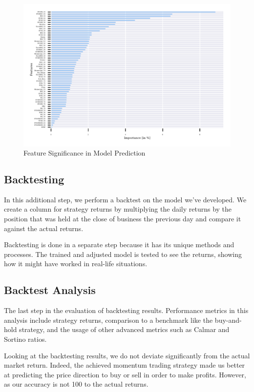 \begin{figure}
\centering
\begin{adjustbox}{max width=1.2\textwidth,center}
\includegraphics[scale=1.2]{./pdf/report/feature_importance.pdf}
\end{adjustbox}
\caption{Feature Significance in Model Prediction}
\label{fig:feature_importance}
\end{figure}


\subsection{Backtesting}

In this additional step, we perform a backtest on the model
we’ve developed. We create a column for strategy returns by multiplying the daily
returns by the position that was held at the close of business the previous day and
compare it against the actual returns.

Backtesting is done in a separate step because it has its unique methods and processes. The trained and adjusted model is tested to see the returns, showing how it might have worked in real-life situations.
\subsection{Backtest Analysis}
The last step in the evaluation of backtesting results. Performance metrics in this analysis include strategy returns, comparison to a benchmark like the buy-and-hold strategy, and the usage of other advanced metrics such as Calmar and Sortino ratios.

Looking at the backtesting results, we do not deviate significantly from the actual
market return. Indeed, the achieved momentum trading strategy made us better at
predicting the price direction to buy or sell in order to make profits. However, as our
accuracy is not 100%
to the actual returns.


